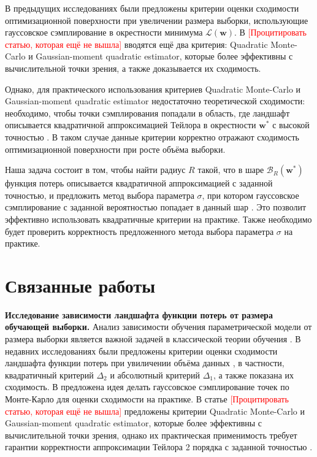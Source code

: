\documentclass[11pt,a4paper]{article}
\begin{document}
В предыдущих исследованиях \cite{kiselev2025posterior} были предложены критерии оценки сходимости оптимизационной поверхности при увеличении размера выборки, использующие гауссовское сэмплирование в окрестности минимума $\mathcal{L}(\mathbf{w})$. В \textcolor{red}{[Процитировать статью, которая ещё не вышла]} вводятся ещё два критерия: Quadratic Monte-Carlo и Gaussian-moment quadratic estimator, которые более эффективны с вычислительной точки зрения, а также доказывается их сходимость. 

Однако, для практического использования критериев Quadratic Monte-Carlo и Gaussian-moment quadratic estimator недостаточно  теоретической сходимости: необходимо, чтобы точки сэмплирования попадали в область, где ландшафт описывается квадратичной аппроксимацией Тейлора в окрестности $\mathbf{w}^{*}$ с высокой точностью \cite{meshkov2024convnets}. В таком случае данные критерии  корректно отражают сходимость оптимизационной поверхности при росте объёма выборки.

Наша задача состоит в том, чтобы найти радиус $R$ такой, что в шаре $\mathcal{B}_R(\mathbf{w}^*)$ функция потерь описывается квадратичной аппроксимацией с заданной точностью, и предложить метод выбора параметра $\sigma$, при котором гауссовское сэмплирование с заданной вероятностью попадает в данный шар \cite{kiselev2025robust}. Это позволит эффективно использовать квадратичные критерии на практике. Также необходимо будет проверить корректность предложенного метода выбора параметра $\sigma$ на практике.


\section{Связанные работы}

\textbf{Исследование зависимости ландшафта функции потерь от размера обучающей выборки.} Анализ зависимости обучения параметрической модели от размера выборки является важной задачей в классической теории обучения \cite{vapnik1995nature}. В недавних исследованиях были предложены критерии оценки сходимости ландшафта функции потерь при увиличении объёма данных \cite{kiselev2025likelihood, kiselev2025posterior, Grabovoy2022Numerical}, в частности, квадратичный критерий $\Delta_2$ и абсолютный критерий $\Delta_1$, а также показана их сходимость.
В \cite{kiselev2025robust} предложена идея делать гауссовское сэмплирование точек по Монте-Карло для оценки сходимости на практике. В статье \textcolor{red}{[Процитировать статью, которая ещё не вышла]} предложены критерии Quadratic Monte-Carlo и Gaussian-moment quadratic estimator, которые более эффективны с вычислительной точки зрения, однако их практическая применимость требует гарантии корректности аппроксимации Тейлора 2 порядка с заданной точностью . 
\end{document}
